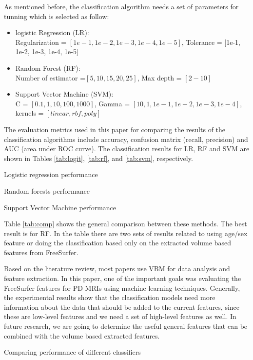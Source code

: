 \documentclass[runningheads,a4paper]{llncs}
\begin{document}
As mentioned before, the classification algorithm needs a set of parameters for tunning which is selected as follow:
\begin{itemize}
\item logistic Regression (LR):\\
Regularization = $[1e-1, 1e-2, 1e-3, 1e-4, 1e-5]$, Tolerance = [1e-1, 1e-2, 1e-3, 1e-4, 1e-5]
\item Random Forest (RF):\\
Number of estimator =$[5, 10, 15, 20, 25]$, Max depth = $[2-10]$
\item Support Vector Machine (SVM): \\
C = $[0.1, 1, 10, 100, 1000]$, Gamma = $[10, 1, 1e-1, 1e-2, 1e-3, 1e-4]$, kernels = $[linear, rbf, poly]$
\end{itemize}
The evaluation metrics used in this paper for comparing the results of the classification algorithms include accuracy, confusion matrix (recall, precision) and AUC (area under ROC curve). The classification results for LR, RF and SVM are shown in Tables \ref{tab:logit}, \ref{tab:rf}, and \ref{tab:svm}, respectively.

\begin{table}[h]\small
	\centering
	\caption{Logistic regression performance}
	\label{tab:logit}
\end{table}

\begin{table}[h]\small
	\centering
	\caption{Random forests performance}
	\label{tab:rf}
\end{table}

\begin{table}[h]\small
	\centering
	\caption{Support Vector Machine performance}
	\label{tab:svm}
\end{table}
Table \ref{tab:comp} shows the general comparison between these methods. The best result is for RF. In the table there are two sets of results related to using age/sex feature or doing the classification based only on the extracted volume based features from FreeSurfer.

Based on the literature review, most papers use VBM for data analysis and feature extraction. In this paper, one of the important goals was evaluating the FreeSurfer features for PD MRIs using machine learning techniques.  Generally, the experimental results show that the classification models need more information about the data that should be added to the current features, since these are low-level features and we need a set of high-level features as well. In future research, we are going to determine the useful general features that can be combined with the volume based extracted features.
\begin{table}[h]\small
	\centering
	\caption{Comparing performance of different classifiers}
	\label{tab:comp}
\end{table}
\end{document}

